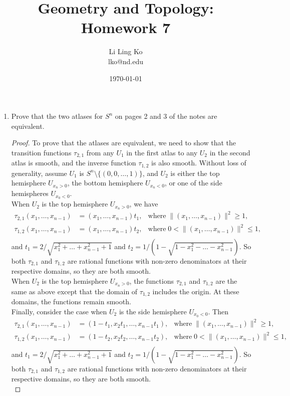 \documentclass{article}
\begin{document}
\title{Geometry and Topology: Homework 7}
\author{Li Ling Ko\\ lko@nd.edu}
\date{\today}
\maketitle

\begin{enumerate}[label={\bf Q\arabic*:}]
  \item Prove that the two atlases for $S^n$ on pages 2 and 3 of the notes
    are equivalent.

    \begin{proof}
      To prove that the atlases are equivalent, we need to show that the
      transition functions $\tau_{2,1}$ from any $U_1$ in the first atlas
      to any $U_2$ in the second atlas is smooth, and the inverse function
      $\tau_{1,2}$ is also smooth. Without loss of generality, assume $U_1$
      is $S^n\setminus\{(0,0,\ldots,1)\}$, and $U_2$ is either the top
      hemisphere $U_{x_n>0}$, the bottom hemisphere $U_{x_n<0}$, or one of
      the side hemispheres $U_{x_0<0}$. \\

      When $U_2$ is the top hemisphere $U_{x_n>0}$, we have
      \begin{align*}
        \tau_{2,1}(x_1,\ldots,x_{n-1}) &= (x_1,\ldots,x_{n-1})t_1, &
        \text{where}\; \|(x_1,\ldots,x_{n-1})\|^2\geq1, \\
        \tau_{1,2}(x_1,\ldots,x_{n-1}) &= (x_1,\ldots,x_{n-1})t_2, &
        \text{where}\; 0<\|(x_1,\ldots,x_{n-1})\|^2\leq1, \\
      \end{align*}
      and $t_1=2/\sqrt{x_1^2+\ldots+x_{n-1}^2+1}$ and
      $t_2=1/(1-\sqrt{1-x_1^2-\ldots-x_{n-1}^2})$. So both $\tau_{2,1}$ and
      $\tau_{1,2}$ are rational functions with non-zero denominators at
      their respective domains, so they are both smooth. \\

      When $U_2$ is the top hemisphere $U_{x_n>0}$, the functions
      $\tau_{2,1}$ and $\tau_{1,2}$ are the same as above
      except that the domain of $\tau_{1,2}$ includes the origin. At these
      domains, the functions remain smooth. \\

      Finally, consider the case when $U_2$ is the side hemisphere
      $U_{x_0<0}$. Then
      \begin{align*}
        \tau_{2,1}(x_1,\ldots,x_{n-1}) &= (1-t_1,x_2t_1,\ldots,x_{n-1}t_1), &
        \text{where}\; \|(x_1,\ldots,x_{n-1})\|^2\geq1, \\
        \tau_{1,2}(x_1,\ldots,x_{n-1}) &= (1-t_2,x_2t_2,\ldots,x_{n-1}t_2), &
        \text{where}\; 0<\|(x_1,\ldots,x_{n-1})\|^2\leq1, \\
      \end{align*}
      and $t_1=2/\sqrt{x_1^2+\ldots+x_{n-1}^2+1}$ and
      $t_2=1/(1-\sqrt{1-x_1^2-\ldots-x_{n-1}^2})$. So both $\tau_{2,1}$ and
      $\tau_{1,2}$ are rational functions with non-zero denominators at
      their respective domains, so they are both smooth. \\
    \end{proof}
\end{enumerate}
\end{document}
